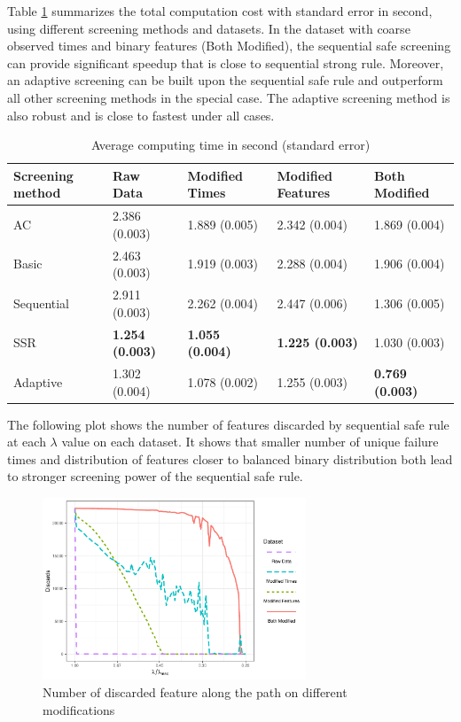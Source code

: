 Table \ref{Tab:real} summarizes the total computation cost with standard error in second, using different screening methods and datasets. In the dataset with coarse observed times and binary features (Both Modified), the sequential safe screening can provide significant speedup that is close to sequential strong rule. Moreover, an adaptive screening can be built upon the sequential safe rule and outperform all other screening methods in the special case. The adaptive screening method is also robust and is close to fastest under all cases.

\begin{table}[H]
\centering
\begin{tabular}{lllll}
\toprule
Screening method & Raw Data & Modified Times & Modified Features & Both Modified \\
\midrule
AC & 2.386 (0.003) & 1.889 (0.005) & 2.342 (0.004) & 1.869 (0.004) \\
Basic & 2.463 (0.003) & 1.919 (0.003) & 2.288 (0.004) & 1.906 (0.004) \\
Sequential & 2.911 (0.003) & 2.262 (0.004) & 2.447 (0.006) & 1.306 (0.005) \\
SSR & \textbf{1.254 (0.003)} & \textbf{1.055 (0.004)} & \textbf{1.225 (0.003)} & 1.030 (0.003) \\
Adaptive & 1.302 (0.004) & 1.078 (0.002) & 1.255 (0.003) & \textbf{0.769 (0.003)} \\
\bottomrule
\end{tabular}
\caption{Average computing time in second (standard error)}
\label{Tab:real}
\end{table}



The following plot shows the number of features discarded by sequential safe rule at each $\lambda$ value on each dataset. It shows that smaller number of unique failure times and distribution of features closer to balanced binary distribution both lead to stronger screening power of the sequential safe rule.

\begin{figure}[ht]
    \centering
    \includegraphics[width=0.7\textwidth]{shedden.pdf}    
    \caption{Number of discarded feature along the path on different modifications}
\end{figure}

